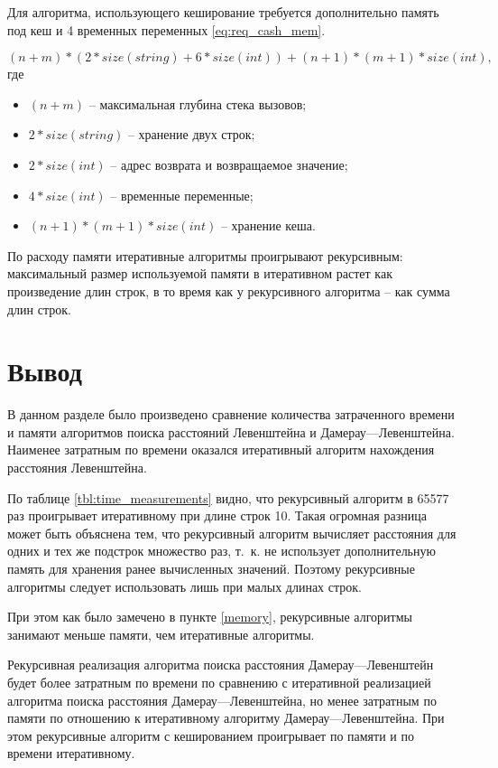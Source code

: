 Для алгоритма, использующего кеширование требуется дополнительно память под кеш и 4 временных переменных \eqref{eq:req_cash_mem}.

\begin{equation}
	\label{eq:req_cash_mem}
	(n + m) * (2 * size(string) + 6 * size(int)) + (n + 1) * (m + 1) * size(int),
\end{equation}
где 
\begin{itemize}
	\item $ (n + m) $ -- максимальная глубина стека вызовов;
	\item $ 2 * size(string) $ -- хранение двух строк;
	\item $ 2 * size(int) $ -- адрес возврата и возвращаемое значение;
	\item $ 4 * size(int) $ -- временные переменные;
	\item $ (n + 1) * (m + 1) * size(int) $ -- хранение кеша.
\end{itemize}

По расходу памяти итеративные алгоритмы проигрывают рекурсивным: максимальный размер используемой памяти в итеративном растет
как произведение длин строк, в то время как у рекурсивного алгоритма --
как сумма длин строк.


\section*{Вывод}

В данном разделе было произведено сравнение количества затраченного времени и памяти алгоритмов поиска расстояний Левенштейна и
Дамерау---Левенштейна. Наименее затратным по времени оказался итеративный алгоритм нахождения расстояния Левенштейна.

По таблице \ref{tbl:time_measurements} видно, что рекурсивный алгоритм в 65577 раз проигрывает итеративному при длине строк 10. Такая огромная разница может быть объяснена тем, что рекурсивный алгоритм вычисляет расстояния для одних и тех же подстрок множество раз, т.~к. не использует дополнительную память для хранения ранее вычисленных значений. Поэтому рекурсивные алгоритмы следует использовать лишь при малых длинах строк.

При этом как было замечено в пункте \ref{memory}, рекурсивные алгоритмы занимают меньше памяти, чем итеративные алгоритмы.

Рекурсивная реализация алгоритма поиска расстояния Дамерау---Левенштейн будет более затратным по времени по сравнению с итеративной реализацией алгоритма поиска расстояния Дамерау---Левенштейна, но менее затратным по памяти по отношению к итеративному алгоритму Дамерау---Левенштейна. При этом рекурсивные алгоритм с кешированием проигрывает по памяти и по времени итеративному.
